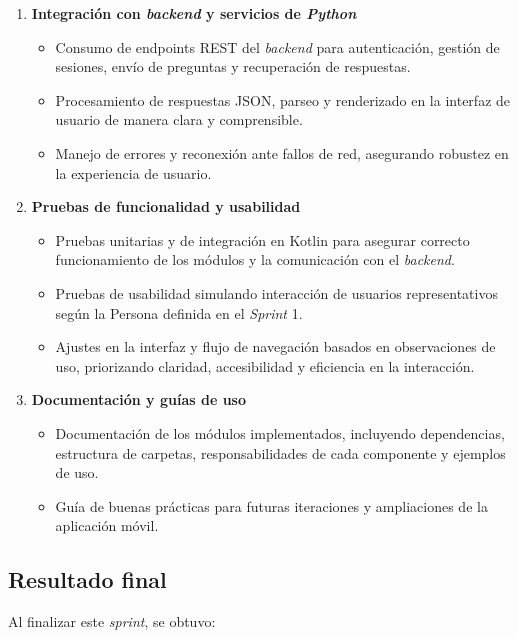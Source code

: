 \begin{enumerate}
      \item \textbf{Integración con \textit{backend} y servicios de \textit{Python}}
            \begin{itemize}
                  \item Consumo de endpoints REST del \textit{backend} para autenticación, gestión de
                        sesiones, envío de preguntas y recuperación de respuestas.
                  \item Procesamiento de respuestas JSON, parseo y renderizado en la interfaz de
                        usuario de manera clara y comprensible.
                  \item Manejo de errores y reconexión ante fallos de red, asegurando robustez en la
                        experiencia de usuario.
            \end{itemize}

      \item \textbf{Pruebas de funcionalidad y usabilidad}
            \begin{itemize}
                  \item Pruebas unitarias y de integración en Kotlin para asegurar correcto
                        funcionamiento de los módulos y la comunicación con el \textit{backend}.
                  \item Pruebas de usabilidad simulando interacción de usuarios representativos según
                        la Persona definida en el \textit{Sprint} 1.
                  \item Ajustes en la interfaz y flujo de navegación basados en observaciones de uso,
                        priorizando claridad, accesibilidad y eficiencia en la interacción.
            \end{itemize}

      \item \textbf{Documentación y guías de uso}
            \begin{itemize}
                  \item Documentación de los módulos implementados, incluyendo dependencias, estructura
                        de carpetas, responsabilidades de cada componente y ejemplos de uso.
                  \item Guía de buenas prácticas para futuras iteraciones y ampliaciones de la
                        aplicación móvil.
            \end{itemize}
\end{enumerate}

\subsection{Resultado final}
Al finalizar este \textit{sprint}, se obtuvo:

